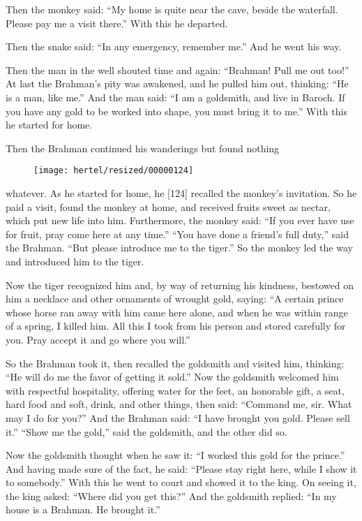 \documentclass[article, twoside, 10pt]{memoir}
\begin{document}
Then the monkey said:
``My home is quite near the cave, beside the waterfall. Please pay me a visit there.''
With this he departed.

Then the snake said: ``In any emergency, remember me.'' And he went
his way.

Then the man in the well shouted time and again:
``Brahman! Pull me out too!'' At last the Brahman's pity was
awakened, and he pulled him out, thinking:
``He is a man, like me.'' And the man said:
``I am a goldsmith, and live in Baroch. If you have any gold to be worked into shape, you must bring it to me.''
With this he started for home.

Then the Brahman continued his wanderings but found nothing
\begin{figure}[p]\texttt{[image: hertel/resized/00000124]}\end{figure}whatever. As he started for home, he [124] recalled the monkey's
invitation. So he paid a visit, found the monkey at home, and
received fruits sweet as nectar, which put new life into him.
Furthermore, the monkey said:
``If you ever have use for fruit, pray come here at any time.''
``You have done a friend's full duty,'' said the Brahman.
``But please introduce me to the tiger.'' So the monkey led the way
and introduced him to the tiger.

Now the tiger recognized him and, by way of returning his kindness,
bestowed on him a necklace and other ornaments of wrought gold,
saying:
``A certain prince whose horse ran away with him came here alone, and when he was within range of a spring, I killed him. All this I took from his person and stored carefully for you. Pray accept it and go where you will.''

So the Brahman took it, then recalled the goldsmith and visited
him, thinking: ``He will do me the favor of getting it sold.'' Now
the goldsmith welcomed him with respectful hospitality, offering
water for the feet, an honorable gift, a seat, hard food and soft,
drink, and other things, then said:
``Command me, sir. What may I do for you?'' And the Brahman said:
``I have brought you gold. Please sell it.'' ``Show me the gold,''
said the goldsmith, and the other did so.

Now the goldsmith thought when he saw it:
``I worked this gold for the prince.'' And having made sure of the
fact, he said:
``Please stay right here, while I show it to somebody.'' With this
he went to court and showed it to the king. On seeing it, the king
asked: ``Where did you get this?'' And the goldsmith replied:
``In my house is a Brahman. He brought it.''
\end{document}
